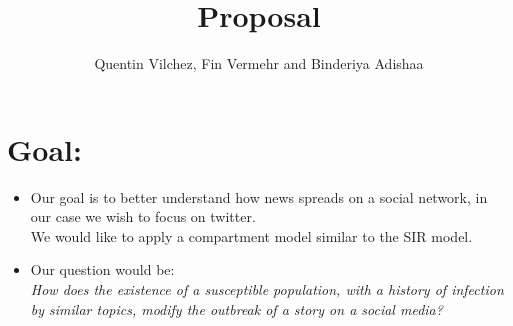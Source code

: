 \documentclass{article}
\author{Quentin Vilchez, Fin Vermehr and Binderiya Adishaa}
\title{Proposal}
\begin{document}
\maketitle
\usetikzlibrary{arrows,automata}
\section{Goal:}
\begin{itemize}
\item Our goal is to better understand how news spreads on a social network, in our case we wish to focus on twitter. \\
We would like to apply a compartment model similar to the SIR model.
\item Our question would be:
\\ \textit{How does the existence of a susceptible population, with a history of infection by similar topics, modify the outbreak of a story on a social media?}
\end{itemize}
\end{document}
